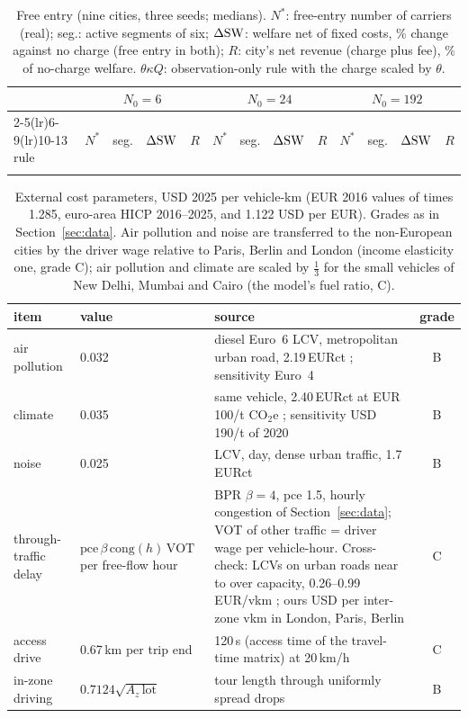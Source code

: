 \documentclass[preprint,11pt,authoryear]{elsarticle}
\theoremstyle{plain}
\theoremstyle{remark}
\begin{document}
\begin{table}[!ht]
\centering\footnotesize\setlength{\tabcolsep}{3pt}
\caption{Free entry (nine cities, three seeds; medians). $N^*$: free-entry number of carriers (real); seg.: active segments of six; $\Delta\mathrm{SW}$: welfare net of fixed costs, \% change against no charge (free entry in both); $R$: city's net revenue (charge plus fee), \% of no-charge welfare. $\theta\kappa Q$: observation-only rule with the charge scaled by $\theta$.}\label{tab:entry}
\begin{tabular}{lrrrrrrrrrrrr}
\toprule
& \multicolumn{4}{c}{$N_0=6$} & \multicolumn{4}{c}{$N_0=24$} & \multicolumn{4}{c}{$N_0=192$}\\
\cmidrule(lr){2-5}\cmidrule(lr){6-9}\cmidrule(lr){10-13}
rule & $N^*$ & seg. & $\Delta\mathrm{SW}$ & $R$ & $N^*$ & seg. & $\Delta\mathrm{SW}$ & $R$ & $N^*$ & seg. & $\Delta\mathrm{SW}$ & $R$\\
\midrule
\\
\bottomrule
\end{tabular}
\end{table}

\begin{table}[!ht]
\centering\footnotesize\setlength{\tabcolsep}{3pt}
\caption{External cost parameters, USD 2025 per vehicle-km (EUR 2016 values of \citet{Handbook2019} times 1.285, euro-area HICP 2016--2025, and 1.122 USD per EUR). Grades as in Section~\ref{sec:data}. Air pollution and noise are transferred to the non-European cities by the driver wage relative to Paris, Berlin and London (income elasticity one, grade C); air pollution and climate are scaled by $\tfrac13$ for the small vehicles of New Delhi, Mumbai and Cairo (the model's fuel ratio, C).}\label{tab:extparams}
\begin{tabular}{p{2.4cm}p{2.9cm}p{8.2cm}c}
\toprule
item & value & source & grade\\
\midrule
air pollution & 0.032 & diesel Euro~6 LCV, metropolitan urban road, 2.19\,EURct \citep[Tab.~19]{Handbook2019}; sensitivity Euro~4 & B\\
climate & 0.035 & same vehicle, 2.40\,EURct at EUR 100/t CO$_2$e \citep[Tab.~28]{Handbook2019}; sensitivity USD 190/t of 2020 \citep{EPA2023} & B\\
noise & 0.025 & LCV, day, dense urban traffic, 1.7\,EURct \citep[Tab.~37]{Handbook2019} & B\\
through-traffic delay & $\mathrm{pce}\,\beta\,\mathrm{cong}(h)\,\mathrm{VOT}$ per free-flow hour & BPR $\beta=4$, pce 1.5, hourly congestion of Section~\ref{sec:data}; VOT of other traffic = driver wage per vehicle-hour. Cross-check: LCVs on urban roads near to over capacity, 0.26--0.99\,EUR/vkm \citep[Tab.~118]{Handbook2019}; ours \ExtCongPerVkmEU{} USD per inter-zone vkm in London, Paris, Berlin & C\\
access drive & 0.67\,km per trip end & 120\,s (access time of the travel-time matrix) at 20\,km/h & C\\
in-zone driving & $0.7124\sqrt{A_z\,\mathrm{lot}}$ & tour length through uniformly spread drops \citep{BHH1959} & B\\
\bottomrule
\end{tabular}
\end{table}
\end{document}
